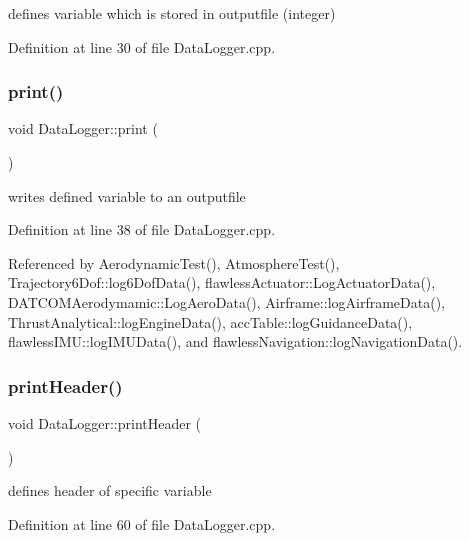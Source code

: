 defines variable which is stored in outputfile (integer) 



Definition at line 30 of file Data\+Logger.\+cpp.

\mbox{\label{class_data_logger_aa1bd66fc07169787398f386d9276708b}} 
\subsubsection{\texorpdfstring{print()}{print()}}
{\footnotesize\ttfamily void Data\+Logger\+::print (\begin{DoxyParamCaption}{ }\end{DoxyParamCaption})}



writes defined variable to an outputfile 



Definition at line 38 of file Data\+Logger.\+cpp.



Referenced by Aerodynamic\+Test(), Atmosphere\+Test(), Trajectory6\+Dof\+::log6\+Dof\+Data(), flawless\+Actuator\+::\+Log\+Actuator\+Data(), D\+A\+T\+C\+O\+M\+Aerodymamic\+::\+Log\+Aero\+Data(), Airframe\+::log\+Airframe\+Data(), Thrust\+Analytical\+::log\+Engine\+Data(), acc\+Table\+::log\+Guidance\+Data(), flawless\+I\+M\+U\+::log\+I\+M\+U\+Data(), and flawless\+Navigation\+::log\+Navigation\+Data().

\mbox{\label{class_data_logger_ad7247b2350411b48f323de6c91e8479c}} 
\subsubsection{\texorpdfstring{print\+Header()}{printHeader()}}
{\footnotesize\ttfamily void Data\+Logger\+::print\+Header (\begin{DoxyParamCaption}{ }\end{DoxyParamCaption})}



defines header of specific variable 



Definition at line 60 of file Data\+Logger.\+cpp.



